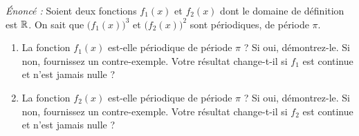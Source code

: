 \begin{exemple}
\emph{Énoncé :} Soient deux fonctions $f_1(x)$ et $f_2(x)$ dont le domaine de définition est $\mathbb{R}$. On sait que $\bigl(f_1(x)\bigr)^3$ et $\bigl(f_2(x)\bigr)^2$ sont périodiques, de période $\pi$.
\begin{enumerate}[label=\alph*)]
    \item La fonction $f_1(x)$ est-elle périodique de période $\pi$ ? Si oui, démontrez-le. Si non, fournissez un contre-exemple. Votre résultat change-t-il si $f_1$ est continue et n'est jamais nulle ?
    \item La fonction $f_2(x)$ est-elle périodique de période $\pi$ ? Si oui, démontrez-le. Si non, fournissez un contre-exemple. Votre résultat change-t-il si $f_2$ est continue et n'est jamais nulle ?
\end{enumerate}


\end{exemple}
